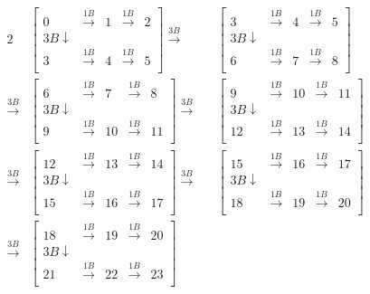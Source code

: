 \documentclass[oneside, 12pt]{report}
\begin{document}
\begin{figure}[H]
\begin{alignat*}{2}
&\begin{bmatrix}
0 & \xrightarrow{1B} & 1 &\xrightarrow{1B} & 2 \\
3B \downarrow \\
3 & \xrightarrow{1B} & 4 &\xrightarrow{1B} & 5 \\
\end{bmatrix}
%
\xrightarrow{3B} 
&&\begin{bmatrix}
3 & \xrightarrow{1B} & 4 &\xrightarrow{1B} & 5 \\
3B \downarrow \\
6 & \xrightarrow{1B} & 7 &\xrightarrow{1B} & 8 \\
\end{bmatrix} \\
%
\xrightarrow{3B} 
&\begin{bmatrix}
6 & \xrightarrow{1B} & 7 &\xrightarrow{1B} & 8 \\
3B \downarrow \\
9 & \xrightarrow{1B} & 10 &\xrightarrow{1B} & 11 \\
\end{bmatrix}
%
\xrightarrow{3B} 
&&\begin{bmatrix}
9 & \xrightarrow{1B} & 10 &\xrightarrow{1B} & 11 \\
3B \downarrow \\
12 & \xrightarrow{1B} & 13 &\xrightarrow{1B} & 14 \\
\end{bmatrix} \\
%
\xrightarrow{3B} 
&\begin{bmatrix}
12 & \xrightarrow{1B} & 13 &\xrightarrow{1B} & 14 \\
3B \downarrow \\
15 & \xrightarrow{1B} & 16 &\xrightarrow{1B} & 17 \\
\end{bmatrix}
%
\xrightarrow{3B} 
&&\begin{bmatrix}
15 & \xrightarrow{1B} & 16 &\xrightarrow{1B} & 17 \\
3B \downarrow \\
18 & \xrightarrow{1B} & 19 &\xrightarrow{1B} & 20 \\
\end{bmatrix} \\
%
\xrightarrow{3B} 
&\begin{bmatrix}
18 & \xrightarrow{1B} & 19 &\xrightarrow{1B} & 20 \\
3B \downarrow \\
21 & \xrightarrow{1B} & 22 &\xrightarrow{1B} & 23 \\
\end{bmatrix}
\end{alignat*}
\end{figure}
\end{document}
